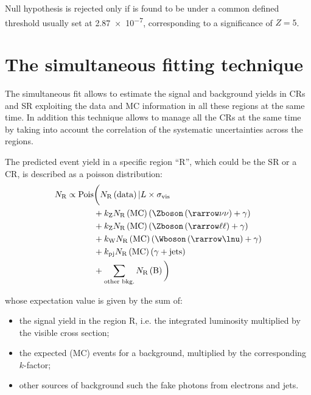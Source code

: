 Null hypothesis is rejected only if \p is found to be under a common defined threshold usually set at \num{2.87e-7}, corresponding to a significance of $Z=5$.

\section{The simultaneous fitting technique}
\label{sec:simfit}
The simultaneous fit allows to estimate the signal and background yields in CRs and SR exploiting the data and MC information in all these regions at the same time. In addition this technique allows to manage all the CRs at the same time by taking into account the correlation of the systematic uncertainties across the regions.

The predicted event yield in a specific region ``R'', which could be the SR or a CR, is described as a poisson distribution:
\begin{equation}
\begin{split}
		N_\textup{R} \propto \text{Pois} &\bigg( N_\textup{R}\left(\text{data}\right)\vert L\times\sigma_{\textup{vis}} \\
						&+ k_{\textup{Z}} N_{\textup{R}}\left(\text{MC}\right) \left(\Zboson \left(\rarrow \nu\nu \right) +  \gamma\right) \\
						&+ k_{\textup{Z}}N_\textup{R}\left(\text{MC}\right) \left(\Zboson \left(\rarrow \ell\ell\right) + \gamma \right) \\
						&+ k_{\textup{W}}N_\textup{R}\left(\text{MC}\right) \left(\Wboson \left(\rarrow \lnu\right)+ \gamma \right) \\
					 	&+ k_{\textup{pj}}N_{\textup{R}}\left(\text{MC}\right) \left(\gamma + \text{jets} \right)\\  
					 	&+ \sum_{\textup{other bkg.}} N_{\textup{R}}\left(\text{B}\right) \bigg)
\end{split}
\label{eqn:nr}
\end{equation}

whose expectation value is given by the sum of:
\begin{itemize}
\item the signal yield in the region R, i.e. the integrated luminosity multiplied by the visible cross section;
\item the expected (MC) events for a background, multiplied by the corresponding $k$-factor;
\item other sources of background such the fake photons from electrons and jets.
\end{itemize}

